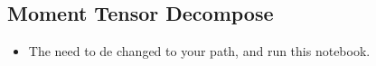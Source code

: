 \documentclass[a4paper,10pt,english,openany]{sphinxmanual}
\begin{document}


\subsection{Moment Tensor Decompose}
\label{\detokenize{tutorials/S8_Decompose_MT:moment-tensor-decompose}}\label{\detokenize{tutorials/S8_Decompose_MT::doc}}\begin{itemize}
\item {} 
The  need to de changed to your path, and run this notebook.

\end{itemize}
\end{document}
